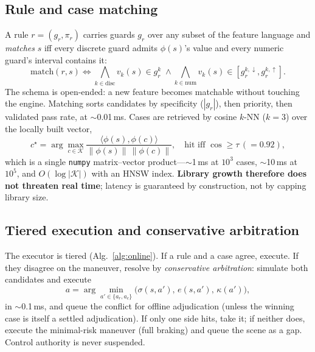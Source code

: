 \documentclass[conference]{IEEEtran}
\begin{document}
\subsection{Rule and case matching}
A rule $r=(g_r,\pi_r)$ carries guards $g_r$ over any subset of the feature
language and \emph{matches} $s$ iff every discrete guard admits $\phi(s)$'s
value and every numeric guard's interval contains it:
\begin{equation}
\mathrm{match}(r,s)\!\iff\!\!\bigwedge_{k\in\mathrm{disc}}\!\! v_k(s)\!\in\! g_r^k \;\wedge\!\!\bigwedge_{k\in\mathrm{num}}\!\! v_k(s)\!\in\![g_r^{k,\downarrow},g_r^{k,\uparrow}].
\end{equation}
The schema is open-ended: a new feature becomes matchable without touching the
engine. Matching sorts candidates by specificity ($|g_r|$), then priority,
then validated pass rate, at $\sim$0.01\,ms. Cases are retrieved by cosine
$k$-NN ($k{=}3$) over the locally built vector,
\begin{equation}
c^\star=\arg\max_{c\in\mathcal{K}}\frac{\langle\phi(s),\phi(c)\rangle}{\lVert\phi(s)\rVert\,\lVert\phi(c)\rVert},\quad
\text{hit iff }\cos\ge\tau\,(=0.92),
\end{equation}
which is a single \texttt{numpy} matrix--vector product---$\sim$1\,ms at
$10^3$ cases, $\sim$10\,ms at $10^5$, and $O(\log|\mathcal{K}|)$ with an HNSW
index. \textbf{Library growth therefore does not threaten real time}; latency
is guaranteed by construction, not by capping library size.

\subsection{Tiered execution and conservative arbitration}
The executor is tiered (Alg.~\ref{alg:online}). If a rule and a case agree,
execute. If they disagree on the maneuver, resolve by \emph{conservative
arbitration}: simulate both candidates and execute
\begin{equation}
a=\arg\min_{a'\in\{a_r,a_c\}}\big(\sigma(s,a'),\,e(s,a'),\,\kappa(a')\big),
\end{equation}
in $\sim$0.1\,ms, and queue the conflict for offline adjudication (unless the
winning case is itself a settled adjudication). If only one side hits, take
it; if neither does, execute the minimal-risk maneuver (full braking) and
queue the scene as a gap. Control authority is never suspended.
\end{document}
